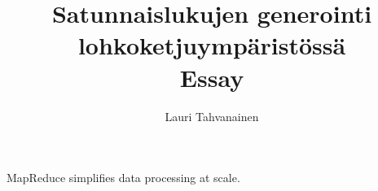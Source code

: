 \documentclass{article}
\title{ Satunnaislukujen generointi lohkoketjuympäristössä \\\small{Essay}}
\author{Lauri Tahvanainen}
\begin{document}
\maketitle

MapReduce \cite{christianson_security_2011} simplifies data processing at scale.



\end{document}
